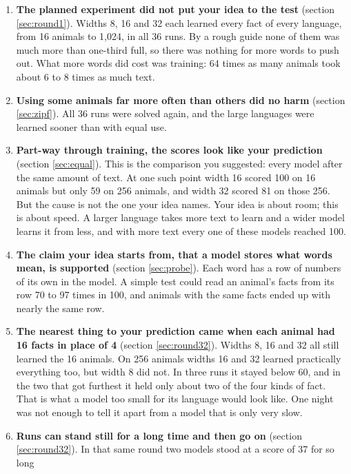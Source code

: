 \begin{keybox}
\begin{enumerate}[itemsep=1pt,topsep=2pt]
\item \textbf{The planned experiment did not put your idea to the test} (section
      \ref{sec:round1}). Widths 8, 16 and 32 each learned every fact of every language, from 16
      animals to 1,024, in all 36 runs. By a rough guide none of them was much more than
      one-third full, so there was nothing for more words to push out. What more words did
      cost was training: 64 times as many animals took about 6 to 8 times as much text.
\item \textbf{Using some animals far more often than others did no harm} (section
      \ref{sec:zipf}). All 36 runs were solved again, and the large languages were learned
      sooner than with equal use.
\item \textbf{Part-way through training, the scores look like your prediction} (section
      \ref{sec:equal}). This is the comparison you suggested: every model after the same
      amount of text. At one such point width 16 scored 100 on 16 animals but only 59 on 256
      animals, and width 32 scored 81 on those 256. But the cause is not the one your idea
      names. Your idea is about room; this is about speed. A larger language takes more text
      to learn and a wider model learns it from less, and with more text every one of these
      models reached 100.
\item \textbf{The claim your idea starts from, that a model stores what words mean, is
      supported} (section \ref{sec:probe}). Each word has a row of numbers of its own in the
      model. A simple test could read an animal's facts from its row 70 to 97 times in 100,
      and animals with the same facts ended up with nearly the same row.
\item \textbf{The nearest thing to your prediction came when each animal had 16 facts in
      place of 4} (section \ref{sec:round32}). Widths 8, 16 and 32 all still learned the 16
      animals. On 256 animals widths 16 and 32 learned practically everything too, but width 8
      did not. In three runs it stayed below 60, and in the two that got furthest it held only
      about two of the four kinds of fact. That is what a model too small for its language would
      look like. One night was not enough to tell it apart from a model that is only very slow.
\item \textbf{Runs can stand still for a long time and then go on} (section
      \ref{sec:round32}). In that same round two models stood at a score of 37 for so long

\end{enumerate}
\end{keybox}
